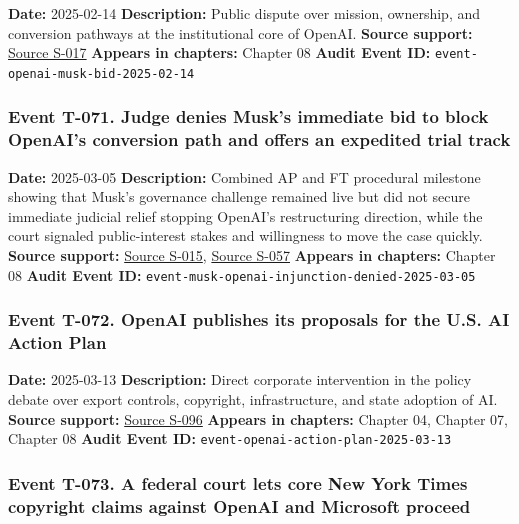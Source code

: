 \documentclass[
  american,
  11pt,
  letterpaper,
]{article}
\begin{document}
\textbf{Date:} 2025-02-14 \textbf{Description:} Public dispute over
mission, ownership, and conversion pathways at the institutional core of
OpenAI. \textbf{Source support:}
\hyperref[source-s-017-openai-board-unanimously-rejects-elon-musk-s-97-4-billion-proposal]{Source
S-017} \textbf{Appears in chapters:} Chapter 08 \textbf{Audit Event ID:}
\texttt{event-openai-musk-bid-2025-02-14}

\subsubsection{Event T-071. Judge denies Musk's immediate bid to block
OpenAI's conversion path and offers an expedited trial
track}\label{event-t-071-judge-denies-musk-s-immediate-bid-to-block-openai-s-conversion-path-and-offers-an-expedited-trial-track}

\textbf{Date:} 2025-03-05 \textbf{Description:} Combined AP and FT
procedural milestone showing that Musk's governance challenge remained
live but did not secure immediate judicial relief stopping OpenAI's
restructuring direction, while the court signaled public-interest stakes
and willingness to move the case quickly. \textbf{Source support:}
\hyperref[source-s-015-judge-denies-elon-musk-s-request-to-block-openai-for-profit-conversion-but-welcomes-trial]{Source
S-015},
\hyperref[source-s-057-judge-denies-elon-musks-attempt-to-immediately-block-openais-conversion-to-for-profit-entity]{Source
S-057} \textbf{Appears in chapters:} Chapter 08 \textbf{Audit Event ID:}
\texttt{event-musk-openai-injunction-denied-2025-03-05}

\subsubsection{Event T-072. OpenAI publishes its proposals for the U.S.
AI Action
Plan}\label{event-t-072-openai-publishes-its-proposals-for-the-u-s-ai-action-plan}

\textbf{Date:} 2025-03-13 \textbf{Description:} Direct corporate
intervention in the policy debate over export controls, copyright,
infrastructure, and state adoption of AI. \textbf{Source support:}
\hyperref[source-s-096-openais-proposals-for-the-us-ai-action-plan]{Source
S-096} \textbf{Appears in chapters:} Chapter 04, Chapter 07, Chapter 08
\textbf{Audit Event ID:} \texttt{event-openai-action-plan-2025-03-13}

\subsubsection{Event T-073. A federal court lets core New York Times
copyright claims against OpenAI and Microsoft
proceed}\label{event-t-073-a-federal-court-lets-core-new-york-times-copyright-claims-against-openai-and-microsoft-proceed}
\end{document}
